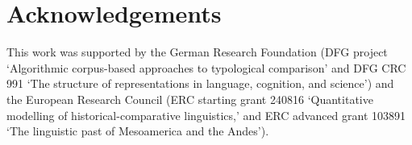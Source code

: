 \documentclass[10pt, a4paper]{article}
\begin{document}
\section{Acknowledgements}
This work was supported by the German Research Foundation 
(DFG project `Algorithmic corpus-based approaches to typological comparison' and DFG CRC 991 `{The
structure of representations in language, cognition, and science}') and the European Research
Council (ERC starting grant 240816 `{Quantitative modelling of historical-comparative linguistics},'
and ERC advanced grant 103891 `{The linguistic past of Mesoamerica and the Andes}'). 



\end{document}
